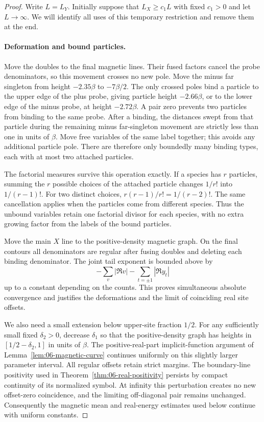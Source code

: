 \begin{proof}
Write $L=L_Y$.  Initially suppose that $L_X\ge c_1L$ with fixed
$c_1>0$ and let $L\to\infty$.  We will identify all uses of this
temporary restriction and remove them at the end.

\paragraph{Deformation and bound particles.}
Move the doubles to the final magnetic lines.  Their fused factors
cancel the probe denominators, so this movement crosses no new pole.
Move the minus far singleton from height $-2.35\beta$ to
$-7\beta/2$.  The only crossed poles bind a particle to the upper
edge of the plus probe, giving particle height $-2.66\beta$, or
to the lower edge of the minus probe, at height $-2.72\beta$.
A pair zero prevents two particles from binding to the same probe.
After a binding, the distances swept from that particle during the
remaining minus far-singleton movement are strictly less than one in
units of $\beta$.  Move free variables
of the same label together; this avoids any additional particle pole.
There are therefore only boundedly many binding types, each with at
most two attached particles.

The factorial measures survive this operation exactly.  If a species
has $r$ particles, summing the $r$ possible choices of the attached
particle changes $1/r!$ into $1/(r-1)!$.  For two distinct choices,
$r(r-1)/r!=1/(r-2)!$.  The same cancellation applies when the
particles come from different species.  Thus the unbound variables
retain one factorial divisor for each species, with no extra growing
factor from the labels of the bound particles.

Move the main $X$ line to the positive-density magnetic graph.  On
the final contours all denominators are regular after fusing doubles
and deleting each binding denominator.  The joint tail exponent is
bounded above by
\[
                  -\sum_v|\Re v|-\sum_{t=\pm1}|\Re y_t|
\]
up to a constant depending on the counts.  This proves simultaneous
absolute convergence and justifies the deformations and the limit of
coinciding real site offsets.

We also need a small extension below upper-site fraction $1/2$.
For any sufficiently small fixed $\delta_2>0$, decrease $\delta_1$
so that the positive-density graph has heights in
$[1/2-\delta_2,1]$ in units of $\beta$.  The positive-real-part
implicit-function argument of Lemma~\ref{lem:06-magnetic-curve}
continues uniformly on this slightly larger parameter interval.
All regular offsets retain strict margins.  The boundary-line
positivity used in Theorem~\ref{thm:06-real-positivity} persists by
compact continuity of its normalized symbol.  At infinity this
perturbation creates no new offset-zero coincidence, and the limiting
off-diagonal pair remains unchanged.  Consequently the magnetic mean
and real-energy estimates used below continue with uniform constants.


\end{proof}
